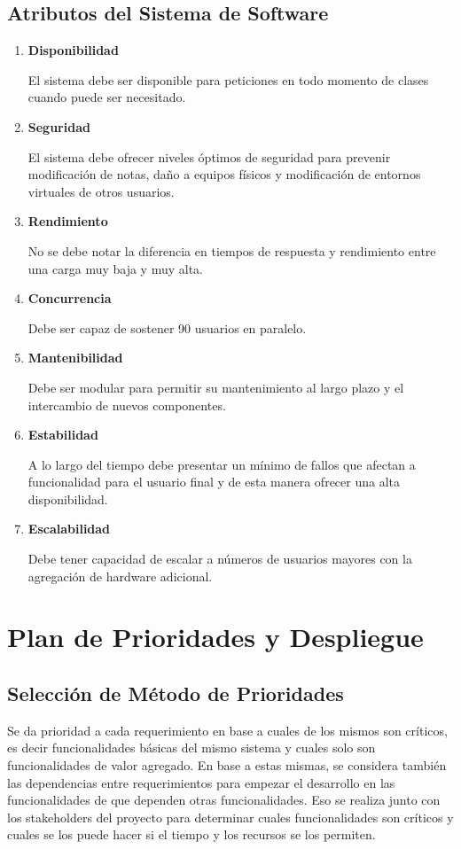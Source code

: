 \subsection{Atributos del Sistema de Software}

\begin{enumerate}
	\item \textbf{Disponibilidad}

El sistema debe ser disponible para peticiones en todo momento de clases cuando puede ser necesitado.
	\item \textbf{Seguridad}

El sistema debe ofrecer niveles óptimos de seguridad para prevenir modificación de notas, daño a equipos físicos y modificación de entornos virtuales de otros usuarios.
	\item \textbf{Rendimiento}

No se debe notar la diferencia en tiempos de respuesta y rendimiento entre una carga muy baja y muy alta.
	\item \textbf{Concurrencia}

Debe ser capaz de sostener 90 usuarios en paralelo.
	\item \textbf{Mantenibilidad}

Debe ser modular para permitir su mantenimiento al largo plazo y el intercambio de nuevos componentes.
	\item \textbf{Estabilidad}

A lo largo del tiempo debe presentar un mínimo de fallos que afectan a funcionalidad para el usuario final y de esta manera ofrecer una alta disponibilidad.
	\item \textbf{Escalabilidad}

Debe tener capacidad de escalar a números de usuarios mayores con la agregación de hardware adicional.
\end{enumerate}

\section{Plan de Prioridades y Despliegue}

\subsection{Selección de Método de Prioridades}
Se da prioridad a cada requerimiento en base a cuales de los mismos son críticos, es decir funcionalidades básicas del mismo sistema y cuales solo son funcionalidades de valor agregado. En base a estas mismas, se considera también las dependencias entre requerimientos para empezar el desarrollo en las funcionalidades de que dependen otras funcionalidades. Eso se realiza junto con los stakeholders del proyecto para determinar cuales funcionalidades son críticos y cuales se los puede hacer si el tiempo y los recursos se los permiten.

